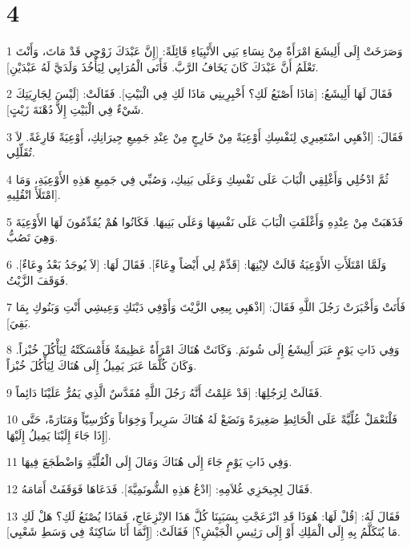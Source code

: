 \chapter{4}

\par 1 وَصَرَخَتْ إِلَى أَلِيشَعَ امْرَأَةٌ مِنْ نِسَاءِ بَنِي الأَنْبِيَاءِ قَائِلَةً: [إِنَّ عَبْدَكَ زَوْجِي قَدْ مَاتَ، وَأَنْتَ تَعْلَمُ أَنَّ عَبْدَكَ كَانَ يَخَافُ الرَّبَّ. فَأَتَى الْمُرَابِي لِيَأْخُذَ وَلَدَيَّ لَهُ عَبْدَيْنِ].
\par 2 فَقَالَ لَهَا أَلِيشَعُ: [مَاذَا أَصْنَعُ لَكِ؟ أَخْبِرِينِي مَاذَا لَكِ فِي الْبَيْتِ]. فَقَالَتْ: [لَيْسَ لِجَارِيَتِكَ شَيْءٌ فِي الْبَيْتِ إِلاَّ دُهْنَةَ زَيْتٍ].
\par 3 فَقَالَ: [اذْهَبِي اسْتَعِيرِي لِنَفْسِكِ أَوْعِيَةً مِنْ خَارِجٍ مِنْ عِنْدِ جَمِيعِ جِيرَانِكِ، أَوْعِيَةً فَارِغَةً. لاَ تُقَلِّلِي.
\par 4 ثُمَّ ادْخُلِي وَأَغْلِقِي الْبَابَ عَلَى نَفْسِكِ وَعَلَى بَنِيكِ، وَصُبِّي فِي جَمِيعِ هَذِهِ الأَوْعِيَةِ، وَمَا امْتَلَأَ انْقُلِيهِ].
\par 5 فَذَهَبَتْ مِنْ عِنْدِهِ وَأَغْلَقَتِ الْبَابَ عَلَى نَفْسِهَا وَعَلَى بَنِيهَا. فَكَانُوا هُمْ يُقَدِّمُونَ لَهَا الأَوْعِيَةَ وَهِيَ تَصُبُّ.
\par 6 وَلَمَّا امْتَلَأَتِ الأَوْعِيَةُ قَالَتْ لاِبْنِهَا: [قَدِّمْ لِي أَيْضاً وِعَاءً]. فَقَالَ لَهَا: [لاَ يُوجَدُ بَعْدُ وِعَاءٌ]. فَوَقَفَ الزَّيْتُ.
\par 7 فَأَتَتْ وَأَخْبَرَتْ رَجُلَ اللَّهِ فَقَالَ: [اذْهَبِي بِيعِي الزَّيْتَ وَأَوْفِي دَيْنَكِ وَعِيشِي أَنْتِ وَبَنُوكِ بِمَا بَقِيَ].
\par 8 وَفِي ذَاتِ يَوْمٍ عَبَرَ أَلِيشَعُ إِلَى شُونَمَ. وَكَانَتْ هُنَاكَ امْرَأَةٌ عَظِيمَةٌ فَأَمْسَكَتْهُ لِيَأْكُلَ خُبْزاً. وَكَانَ كُلَّمَا عَبَرَ يَمِيلُ إِلَى هُنَاكَ لِيَأْكُلَ خُبْزاً.
\par 9 فَقَالَتْ لِرَجُلِهَا: [قَدْ عَلِمْتُ أَنَّهُ رَجُلَ اللَّهِ مُقَدَّسٌ الَّذِي يَمُرُّ عَلَيْنَا دَائِماً.
\par 10 فَلْنَعْمَلْ عُلِّيَّةً عَلَى الْحَائِطِ صَغِيرَةً وَنَضَعْ لَهُ هُنَاكَ سَرِيراً وَخِوَاناً وَكُرْسِيّاً وَمَنَارَةً، حَتَّى إِذَا جَاءَ إِلَيْنَا يَمِيلُ إِلَيْهَا].
\par 11 وَفِي ذَاتِ يَوْمٍ جَاءَ إِلَى هُنَاكَ وَمَالَ إِلَى الْعُلِّيَّةِ وَاضْطَجَعَ فِيهَا.
\par 12 فَقَالَ لِجِيحَزِي غُلاَمِهِ: [ادْعُ هَذِهِ الشُّونَمِيَّةَ]. فَدَعَاهَا فَوَقَفَتْ أَمَامَهُ.
\par 13 فَقَالَ لَهُ: [قُلْ لَهَا: هُوَذَا قَدِ انْزَعَجْتِ بِسَبَبِنَا كُلَّ هَذَا الاِنْزِعَاجِ، فَمَاذَا يُصْنَعُ لَكِ؟ هَلْ لَكِ مَا يُتَكَلَّمُ بِهِ إِلَى الْمَلِكِ أَوْ إِلَى رَئِيسِ الْجَيْشِ؟] فَقَالَتْ: [إِنَّمَا أَنَا سَاكِنَةٌ فِي وَسَطِ شَعْبِي].
